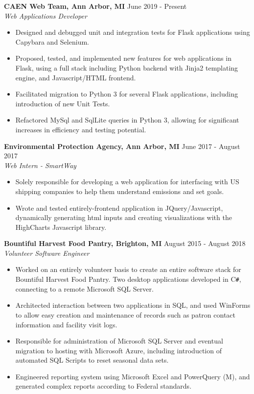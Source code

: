 \documentclass[overlapped]{res}
\begin{document}
\begin{resume}
    \textbf{CAEN Web Team, Ann Arbor, MI}
    \hfill June 2019 - Present \\
    {\sl Web Applications Developer}
    \begin{itemize}  \itemsep -2pt %
        \item Designed and debugged unit and integration tests for Flask applications using Capybara and Selenium.
        \item Proposed, tested, and implemented new features for web applications in Flask, using a full stack including Python backend with Jinja2 templating engine, and Javascript/HTML frontend.
        \item Facilitated migration to Python 3 for several Flask applications, including introduction of new Unit Tests.
        \item Refactored MySql and SqlLite queries in Python 3, allowing for significant increases in efficiency and testing potential.
              
    \end{itemize}
    
    \textbf{Environmental Protection Agency, Ann Arbor, MI}
    \hfill June 2017 - August 2017 \\
    {\sl Web Intern - SmartWay}
    \begin{itemize}  \itemsep -2pt %
        \item Solely responsible for developing a web application for interfacing with US shipping companies to help them understand emissions and set goals.
        \item Wrote and tested entirely-frontend application in JQuery/Javascript, dynamically generating html inputs and creating visualizations with the HighCharts Javascript library.
              
    \end{itemize}
    
    \textbf{Bountiful Harvest Food Pantry, Brighton, MI}
    \hfill August 2015 - August 2018 \\
    {\sl Volunteer Software Engineer}
    \begin{itemize}  \itemsep -2pt %
        \item Worked on an entirely volunteer basis to create an entire software stack for Bountiful Harvest Food Pantry. Two desktop applications developed in C\texttt{\#}, connecting to a remote Microsoft SQL Server.
        \item Architected interaction between two applications in SQL, and used WinForms to allow easy creation and maintenance of records such as patron contact information and facility visit logs.
        \item Responsible for administration of Microsoft SQL Server and eventual migration to hosting with Microsoft Azure, including introduction of automated SQL Scripts to reset seasonal data sets.
        \item Engineered reporting system using Microsoft Excel and PowerQuery (M), and generated complex reports according to Federal standards.
    \end{itemize}
    

\end{resume}
\end{document}

